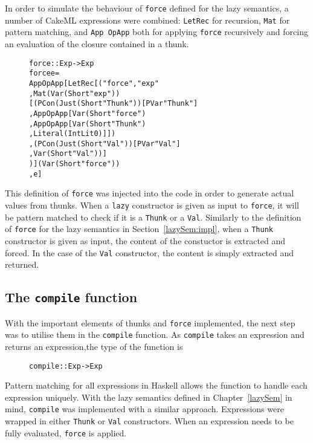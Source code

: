 In order to simulate the behaviour of \texttt{force} defined for the lazy
semantics, a number of CakeML expressions were combined:
\texttt{LetRec} for recursion, \texttt{Mat} for pattern
matching, and \texttt{App OpApp} both for applying \texttt{force} recursively
and forcing an evaluation of the closure contained in a thunk.

\begin{figure}[H]
\begin{alltt}
force :: Exp -> Exp
force e =
  App OpApp [LetRec [("force", "exp"
                     , Mat (Var (Short "exp"))
                       [(PCon (Just (Short "Thunk")) [PVar "Thunk"]
                        , App OpApp [Var (Short "force")
                                    , App OpApp [Var (Short "Thunk")
                                                , Literal (IntLit 0)]])
                       ,(PCon (Just (Short "Val")) [PVar "Val"]
                        , Var (Short "Val"))]
                     )] (Var (Short "force"))
            , e]
\end{alltt}
\end{figure}

\noindent This definition of \texttt{force} was injected into the code in order
to generate actual values from thunks. When a \texttt{lazy} constructor is given
as input to \texttt{force}, it will be pattern matched to check if it is a
\texttt{Thunk} or a \texttt{Val}. Similarly to the definition of \texttt{force}
for the lazy semantics in Section~\ref{lazySem:impl}, when a \texttt{Thunk}
constructor is given as input, the content of the constuctor is extracted and
forced. In the case of the \texttt{Val} constructor, the content is simply
extracted and returned.

\subsection{The \texttt{compile} function}
With the important elements of thunks and \texttt{force} implemented, the next
step was to utilise them in the \texttt{compile} function. 
As \texttt{compile} takes an expression and returns an expression,the type of
the function is

\begin{figure}[H]
\begin{alltt}
  compile :: Exp -> Exp
\end{alltt}
\end{figure}

\noindent Pattern matching for all expressions in Haskell allows the function to
handle each expression uniquely. With the lazy semantics defined in
Chapter~\ref{lazySem} in mind, \texttt{compile} was implemented with a similar
approach. Expressions were wrapped in either \texttt{Thunk} or
\texttt{Val} constructors. When an expression needs to be fully evaluated,
\texttt{force} is applied.

